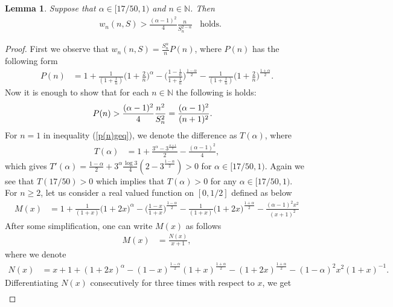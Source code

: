 \documentclass[12pt]{amsart}
\newtheorem{Lemma}[Theorem]{\sc Lemma}
\theoremstyle{definition}
\theoremstyle{plain}
\theoremstyle{definition}
\numberwithin{equation}{section}
\begin{document}
\begin{Lemma}{\label{W-grater}}
Suppose that $\alpha\in[17/50, 1)$ and $n\in\mathbb{N}$. Then
\begin{align*}
&w_{n}(n,S)>\frac{(\alpha-1)^{2}}{4}\frac{n}{S_{n}^{2-\alpha}}~~~~\mbox{holds}.
\end{align*}
\end{Lemma}
\begin{proof}
First we observe that $w_{n}(n,S)=\frac{S_{n}^{\alpha}}{n}P(n)$, where $P(n)$ has the following form
\begin{align*}
P(n)&=1+\frac{1}{(1+\frac{1}{n})}\Big(1+\frac{2}{n}\Big)^{\alpha}-\Big(\frac{1-\frac{1}{n}}{1+\frac{1}{n}}\Big)^{\frac{1-\alpha}{2}}
-\frac{1}{(1+\frac{1}{n})}\Big(1+\frac{2}{n}\Big)^{\frac{1+\alpha}{2}}.
\end{align*}Now it is enough to show that for each $n\in\mathbb{N}$ the following is holds:
\begin{align}{\label{p(n)geq}}
&P(n)>\frac{(\alpha-1)^{2}}{4}\frac{n^{2}}{S_{n}^{2}}=\frac{(\alpha-1)^{2}}{(n+1)^{2}}.
\end{align}
For $n=1$ in inequality (\ref{p(n)geq}), we denote the difference as $T(\alpha)$, where
\begin{align}
T(\alpha)&=1+\frac{3^{\alpha}-3^{\frac{\alpha+1}{2}}}{2}-\frac{(\alpha-1)^{2}}{4},
\end{align}
which gives $T'(\alpha)=\frac{1-\alpha}{2}+3^{\alpha}\frac{\log3}{4}(2-3^{\frac{1-\alpha}{2}})>0$ for $\alpha\in[17/50, 1)$. Again we see that $T(17/50)>0$ which implies that $T(\alpha)>0$ for any $\alpha\in[17/50,1)$.\\
For $n\geq2$, let us consider a real valued function on $[0,1/2]$ defined as below
\begin{align*}
M(x)&=1+\frac{1}{(1+x)}\Big(1+2x\Big)^{\alpha}-\Big(\frac{1-x}{1+x}\Big)^{\frac{1-\alpha}{2}}-\frac{1}{(1+x)}\Big(1+2x\Big)^{\frac{1+\alpha}{2}}-\frac{(\alpha-1)^{2}x^{2}}{(x+1)^{2}}
\end{align*}
After some simplification, one can write $M(x)$ as follows
\begin{align*}
M(x)&=\frac{N(x)}{x+1},
\end{align*}where we denote
\begin{align*}
N(x)&=x+1+(1+2x)^{\alpha}-(1-x)^{\frac{1-\alpha}{2}}(1+x)^{\frac{1+\alpha}{2}}-(1+2x)^{\frac{1+\alpha}{2}}-(1-\alpha)^{2}x^{2}(1+x)^{-1}.
\end{align*}
Differentiating $N(x)$ consecutively for three times with respect to $x$, we get
\begin{align*}

\end{align*}
\end{proof}
\end{document}
